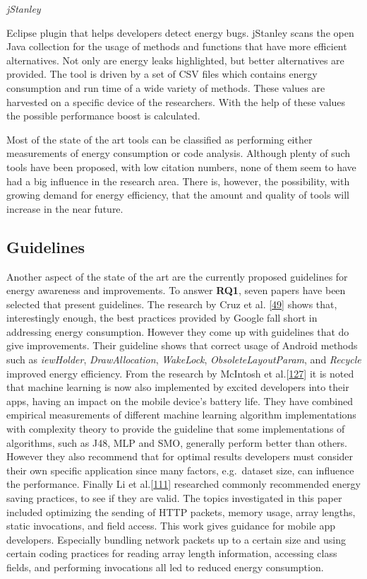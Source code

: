 \documentclass[]{book}
\begin{document}
\emph{jStanley}

Eclipse plugin that helps developers detect energy bugs. jStanley scans
the open Java collection for the usage of methods and functions that
have more efficient alternatives. Not only are energy leaks highlighted,
but better alternatives are provided. The tool is driven by a set of CSV
files which contains energy consumption and run time of a wide variety
of methods. These values are harvested on a specific device of the
researchers. With the help of these values the possible performance
boost is calculated.

Most of the state of the art tools can be classified as performing
either measurements of energy consumption or code analysis. Although
plenty of such tools have been proposed, with low citation numbers, none
of them seem to have had a big influence in the research area. There is,
however, the possibility, with growing demand for energy efficiency,
that the amount and quality of tools will increase in the near future.

\subsection{Guidelines}\label{guidelines}

Another aspect of the state of the art are the currently proposed
guidelines for energy awareness and improvements. To answer
\textbf{RQ1}, seven papers have been selected that present guidelines.
The research by Cruz et al. {[}\protect\hyperlink{ref-CA2017}{49}{]}
shows that, interestingly enough, the best practices provided by Google
fall short in addressing energy consumption. However they come up with
guidelines that do give improvements. Their guideline shows that correct
usage of Android methods such as \emph{iewHolder},
\emph{DrawAllocation}, \emph{WakeLock}, \emph{ObsoleteLayoutParam}, and
\emph{Recycle} improved energy efficiency. From the research by McIntosh
et al.{[}\protect\hyperlink{ref-MSA2018}{127}{]} it is noted that
machine learning is now also implemented by excited developers into
their apps, having an impact on the mobile device's battery life. They
have combined empirical measurements of different machine learning
algorithm implementations with complexity theory to provide the
guideline that some implementations of algorithms, such as J48, MLP and
SMO, generally perform better than others. However they also recommend
that for optimal results developers must consider their own specific
application since many factors, e.g.~dataset size, can influence the
performance. Finally Li et al.{[}\protect\hyperlink{ref-LH2014}{111}{]}
researched commonly recommended energy saving practices, to see if they
are valid. The topics investigated in this paper included optimizing the
sending of HTTP packets, memory usage, array lengths, static
invocations, and field access. This work gives guidance for mobile app
developers. Especially bundling network packets up to a certain size and
using certain coding practices for reading array length information,
accessing class fields, and performing invocations all led to reduced
energy consumption.
\end{document}
